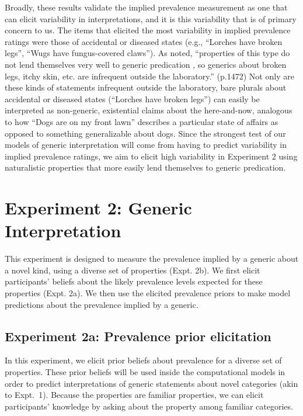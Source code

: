 \documentclass[floatsintext,doc]{apa6}
\begin{document}
Broadly, these results validate the implied prevalence measurement as one that can elicit variability in interpretations, and it is this variability that is of primary concern to us.
The items that elicited the most variability in implied prevalence ratings were those of accidental or diseased states (e.g., \enquote{Lorches have broken legs}, \enquote{Wugs have fungus-covered claws}).
As  noted, \enquote{properties of this type do not lend themselves very well to generic predication \cite{gelman1988development, Cimpian2008}, so generics about broken legs, itchy skin, etc. are infrequent outside the laboratory.} (p.1472)
Not only are these kinds of statements infrequent outside the laboratory, bare plurals about accidental or diseased states (\enquote{Lorches have broken legs}) can easily be interpreted as non-generic, existential claims about the here-and-now, analogous to how \enquote{Dogs are on my front lawn} describes a particular state of affairs as opposed to something generalizable about dogs.
Since the strongest test of our models of generic interpretation will come from having to predict variability in implied prevalence ratings, we aim to elicit high variability in Experiment 2 using naturalistic properties that more easily lend themselves to generic predication.




\hypertarget{experiment-1}{%
\section{Experiment 2: Generic Interpretation}\label{experiment-1}}

This experiment is designed to measure the prevalence implied by a generic about a novel kind, using a diverse set of properties (Expt. 2b).
We first elicit participants' beliefs about the likely prevalence levels expected for these properties (Expt. 2a).
We then use the elicited prevalence priors to make model predictions about the prevalence implied by a generic.

\hypertarget{experiment-1a-prevalence-prior-elicitation}{%
\subsection{Experiment 2a: Prevalence prior elicitation}\label{experiment-1a-prevalence-prior-elicitation}}

In this experiment, we elicit prior beliefs about prevalence for a diverse set of properties.
These prior beliefs will be used inside the computational models in order to predict interpretations of generic statements about novel categories (akin to Expt.~1). 
Because the properties are familiar properties, we can elicit participants' knowledge by asking about the property among familiar  categories.
\end{document}
